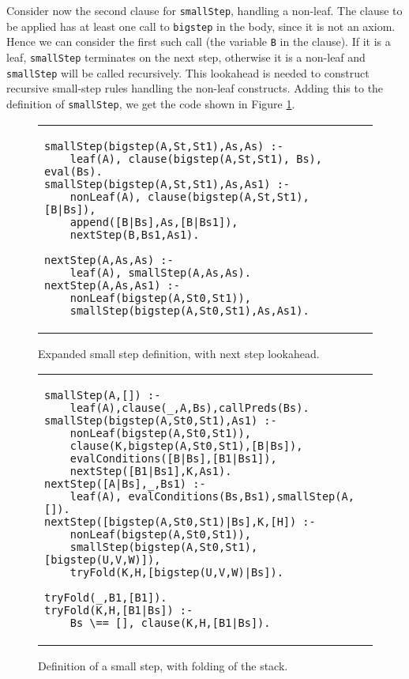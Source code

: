 \documentclass{llncs}
\begin{document}
Consider now the second clause for \texttt{smallStep}, handling a non-leaf.  The clause to be applied has at least one
call to \texttt{bigstep} in the body, since it is not an axiom. Hence we can consider the first such call (the variable \texttt{B} in the clause).
If it is a leaf, \texttt{smallStep} terminates on the next step, otherwise it is a non-leaf and \texttt{smallStep} will be called recursively.
This lookahead is needed to construct recursive small-step rules handling the non-leaf constructs. Adding this to the definition of
\texttt{smallStep}, we get the code shown in Figure \ref{fig:linear-nextstep}.

\begin{figure}
\begin{tabular}{l}
\begin{lstlisting}
smallStep(bigstep(A,St,St1),As,As) :- 
    leaf(A), clause(bigstep(A,St,St1), Bs), eval(Bs).
smallStep(bigstep(A,St,St1),As,As1) :- 
    nonLeaf(A), clause(bigstep(A,St,St1), [B|Bs]),
    append([B|Bs],As,[B|Bs1]),
    nextStep(B,Bs1,As1).
    
nextStep(A,As,As) :-
    leaf(A), smallStep(A,As,As).
nextStep(A,As,As1) :-
    nonLeaf(bigstep(A,St0,St1)),
    smallStep(bigstep(A,St0,St1),As,As1).
\end{lstlisting}
\end{tabular}
\caption{Expanded small step definition, with next step lookahead.}\label{fig:linear-nextstep}
\end{figure}

\begin{figure}
\begin{tabular}{l}
\begin{lstlisting}
smallStep(A,[]) :-
	leaf(A),clause(_,A,Bs),callPreds(Bs).
smallStep(bigstep(A,St0,St1),As1) :-
	nonLeaf(bigstep(A,St0,St1)),
	clause(K,bigstep(A,St0,St1),[B|Bs]),
	evalConditions([B|Bs],[B1|Bs1]),
	nextStep([B1|Bs1],K,As1).	
nextStep([A|Bs],_,Bs1) :-
	leaf(A), evalConditions(Bs,Bs1),smallStep(A,[]).
nextStep([bigstep(A,St0,St1)|Bs],K,[H]) :-
	nonLeaf(bigstep(A,St0,St1)),
	smallStep(bigstep(A,St0,St1),[bigstep(U,V,W)]),
	tryFold(K,H,[bigstep(U,V,W)|Bs]).
	
tryFold(_,B1,[B1]).
tryFold(K,H,[B1|Bs]) :-
	Bs \== [], clause(K,H,[B1|Bs]).
\end{lstlisting}
\end{tabular}
\caption{Definition of a small step, with folding of the stack.}\label{fig:linear-fold}
\end{figure}
\end{document}
